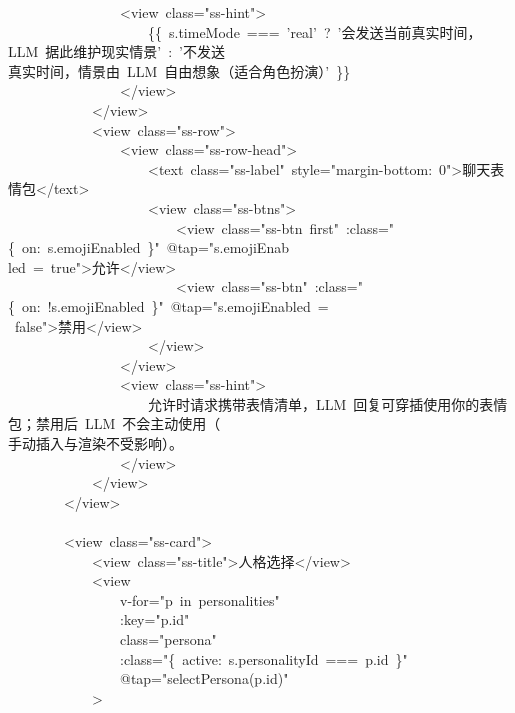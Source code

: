 \documentclass[a4paper,10pt]{article}
\begin{document}
{\ttfamily\footnotesize\raggedright
~~~~~~~~~~~~~~~~<view~class="ss-hint">\\
~~~~~~~~~~~~~~~~~~~~\{\{~s.timeMode~===~'real'~?~'会发送当前真实时间，LLM~据此维护现实情景'~:~'不发送\\
真实时间，情景由~LLM~自由想象（适合角色扮演）'~\}\}\\
~~~~~~~~~~~~~~~~</view>\\
~~~~~~~~~~~~</view>\\
~~~~~~~~~~~~<view~class="ss-row">\\
~~~~~~~~~~~~~~~~<view~class="ss-row-head">\\
~~~~~~~~~~~~~~~~~~~~<text~class="ss-label"~style="margin-bottom:~0">聊天表情包</text>\\
~~~~~~~~~~~~~~~~~~~~<view~class="ss-btns">\\
~~~~~~~~~~~~~~~~~~~~~~~~<view~class="ss-btn~first"~:class="\{~on:~s.emojiEnabled~\}"~@tap="s.emojiEnab\\
led~=~true">允许</view>\\
~~~~~~~~~~~~~~~~~~~~~~~~<view~class="ss-btn"~:class="\{~on:~!s.emojiEnabled~\}"~@tap="s.emojiEnabled~=\\
~false">禁用</view>\\
~~~~~~~~~~~~~~~~~~~~</view>\\
~~~~~~~~~~~~~~~~</view>\\
~~~~~~~~~~~~~~~~<view~class="ss-hint">\\
~~~~~~~~~~~~~~~~~~~~允许时请求携带表情清单，LLM~回复可穿插使用你的表情包；禁用后~LLM~不会主动使用（\\
手动插入与渲染不受影响）。\\
~~~~~~~~~~~~~~~~</view>\\
~~~~~~~~~~~~</view>\\
~~~~~~~~</view>\\
\mbox{}\\
~~~~~~~~<view~class="ss-card">\\
~~~~~~~~~~~~<view~class="ss-title">人格选择</view>\\
~~~~~~~~~~~~<view\\
~~~~~~~~~~~~~~~~v-for="p~in~personalities"\\
~~~~~~~~~~~~~~~~:key="p.id"\\
~~~~~~~~~~~~~~~~class="persona"\\
~~~~~~~~~~~~~~~~:class="\{~active:~s.personalityId~===~p.id~\}"\\
~~~~~~~~~~~~~~~~@tap="selectPersona(p.id)"\\
~~~~~~~~~~~~>\\
}
\end{document}
